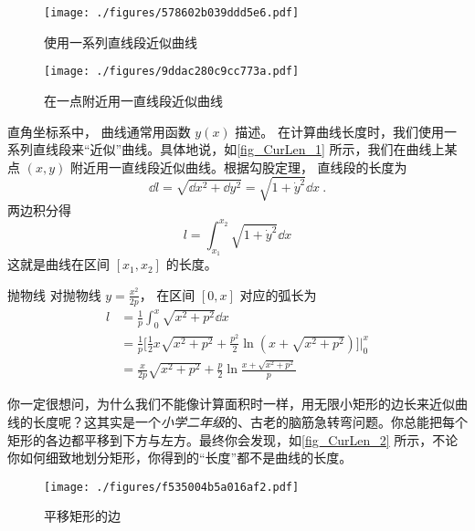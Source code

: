 

\begin{figure}[ht]
\centering
\texttt{[image: ./figures/578602b039ddd5e6.pdf]}
\caption{使用一系列直线段近似曲线} \label{fig_CurLen_3}
\end{figure}

\begin{figure}[ht]
\centering
\texttt{[image: ./figures/9ddac280c9cc773a.pdf]}
\caption{在一点附近用一直线段近似曲线} \label{fig_CurLen_1}
\end{figure}

直角坐标系中， 曲线通常用函数 $y(x)$ 描述。 在计算曲线长度时，我们使用一系列直线段来“近似”曲线。具体地说，如\autoref{fig_CurLen_1} 所示，我们在曲线上某点 $(x, y)$ 附近用一直线段近似曲线。根据勾股定理， 直线段的长度为
\begin{equation}
\dd{l} = \sqrt{\dd{x}^2 + \dd{y}^2} = \sqrt{1 + \dot y^2} \dd{x}~.
\end{equation}
两边积分得
\begin{equation}\label{eq_CurLen_1}
l = \int_{x_1}^{x_2} \sqrt{1 + \dot y^2} \dd{x}
\end{equation}
这就是曲线在区间 $[x_1, x_2]$ 的长度。

\begin{example}{抛物线}
对抛物线 $y=\frac{x^2}{2p}$， 在区间 $[0,x]$ 对应的弧长为
\begin{equation}
\begin{aligned}
l& = \frac{1}{p}\int_{0}^{x}\sqrt{x^2+p^2}\dd{x}\\
&=\frac{1}{p}\bigg[\frac{1}{2}x\sqrt{x^2+p^2}+\frac{p^2}{2}\ln(x+\sqrt{x^2+p^2})\bigg]\Bigg\lvert_{0}^{x}\\
&=\frac{x}{2p}\sqrt{x^2+p^2}+\frac{p}{2}\ln\frac{x+\sqrt{x^2+p^2}}{p}
\end{aligned}
\end{equation}
\end{example}

你一定很想问，为什么我们不能像计算面积时一样，用无限小矩形的边长来近似曲线的长度呢？这其实是一个\textsl{小学二年级}的、古老的脑筋急转弯问题。你总能把每个矩形的各边都平移到下方与左方。最终你会发现，如\autoref{fig_CurLen_2} 所示，不论你如何细致地划分矩形，你得到的“长度”都不是曲线的长度。
\begin{figure}[ht]
\centering
\texttt{[image: ./figures/f535004b5a016af2.pdf]}
\caption{平移矩形的边} \label{fig_CurLen_2}
\end{figure}


